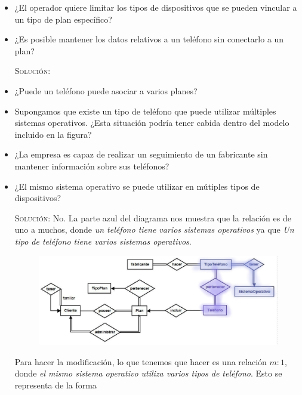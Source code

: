 \documentclass[letterpaper,11pt]{article}
\begin{document}
\begin{itemize}
    \item ¿El operador quiere limitar los tipos de dispositivos que se pueden 
    vincular a un tipo de plan específico?

    \item ¿Es posible mantener los datos relativos a un teléfono sin conectarlo
    a un plan?

    \textsc{Solución:}

    \item ¿Puede un teléfono puede asociar a varios planes?
    
    \item Supongamos que existe un tipo de teléfono que puede utilizar múltiples
    sistemas operativos. ¿Esta situación podría tener cabida dentro del modelo 
    incluido en la figura?

    \item ¿La empresa es capaz de realizar un seguimiento de un fabricante sin 
    mantener información sobre sus teléfonos?

    \item ¿El mismo sistema operativo se puede utilizar en mútiples tipos de  
    dispositivos? 

    \textsc{Solución:} No. La parte azul del diagrama nos muestra que la 
    relación es de uno a muchos, donde \textit{un teléfono tiene varios 
    sistemas operativos} ya que \textit{Un tipo de teléfono tiene varios 
    sistemas operativos}. 

    \begin{figure}[h]
        \centering
        \includegraphics[scale=0.4]{./imagenes/modelo9.jpg}
    \end{figure}

    Para hacer la modificación, lo que tenemos que hacer es una relación $m:1$, 
    donde \textit{el mismo sistema operativo utiliza varios tipos de teléfono}.
    Esto se representa de la forma


\end{itemize}
\end{document}
